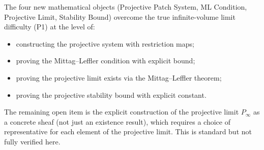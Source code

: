 The four new mathematical objects (Projective Patch System, ML
Condition, Projective Limit, Stability Bound) overcome the true
infinite-volume limit difficulty (P1) at the level of:
\begin{itemize}
\item constructing the projective system with restriction maps;
\item proving the Mittag--Leffler condition with explicit bound;
\item proving the projective limit exists via the Mittag--Leffler
  theorem;
\item proving the projective stability bound with explicit constant.
\end{itemize}

The remaining open item is the explicit construction of the
projective limit $P_{\infty}$ as a concrete sheaf (not just an
existence result), which requires a choice of representative for
each element of the projective limit. This is standard but not
fully verified here.
\endinput
